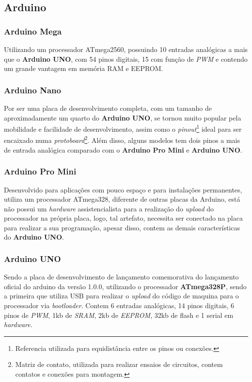 \subsection{Arduino}

\subsubsection{Arduino Mega}
Utilizando um processador ATmega2560, possuindo 10 entradas analógicas a mais que o \textbf{Arduino UNO}, com 54 pinos digitais, 15 com função de \textit{PWM} e contendo um grande vantagem em memória RAM e EEPROM.



\subsubsection{Arduino Nano}

Por ser uma placa de desenvolvimento completa, com um tamanho de aproximadamente um quarto do \textbf{Arduino UNO}, se tornou muito popular pela mobilidade e facilidade de desenvolvimento, assim como o \textit{pinout}\footnote{ Referencia utilizada para equidistância entre os pinos ou conexões.} ideal para ser encaixado numa \textit{protoboard}\footnote{Matriz de contato, utilizada para realizar ensaios de circuitos, contem contatos e conexões para montagem.}. Além disso, alguns modelos tem dois pinos a mais de entrada analógica comparado com o \textbf{Arduino Pro Mini} e \textbf{Arduino UNO}.

\subsubsection{Arduino Pro Mini}

Desenvolvido para aplicações com pouco espaço e para instalações permanentes, utiliza um processador ATmega328,  diferente de outras placas da Arduino, está não possui um \textit{hardware} assistencialista para a realização do \textit{upload} do processador na própria placa, logo, tal artefato, necessita ser conectado na placa para realizar a sua programação, apesar disso, contem as demais características do \textbf{Arduino UNO}.

\subsubsection{Arduino UNO}

Sendo a placa de desenvolvimento de lançamento comemorativa do lançamento oficial do arduino da versão 1.0.0, utilizando o processador \textbf{ATmega328P}, sendo a primeira que utiliza USB para realizar o \textit{upload} do código de maquina para o processador via \textit{bootloader}. Contem 6 entradas analógicas, 14 pinos digitais, 6 pinos de \textit{PWM}, 1kb de \textit{SRAM}, 2kb de \textit{EEPROM}, 32kb de flash e 1 serial em \textit{hardware}.

